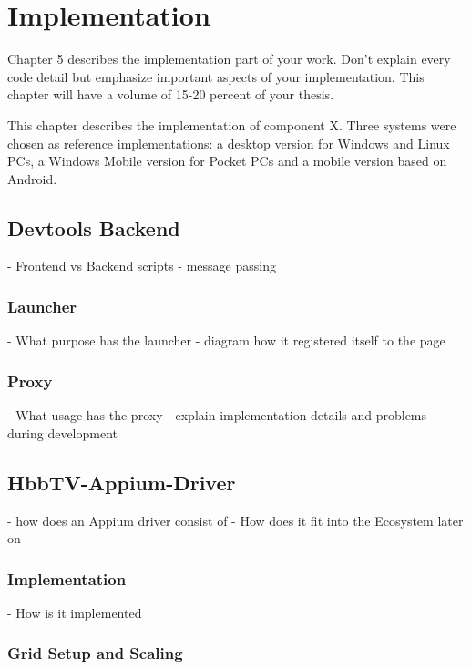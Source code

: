 \chapter{Implementation\label{cha:chapter5}}

Chapter 5 describes the implementation part of your work. Don't explain every code detail but emphasize
important aspects of your implementation. This chapter will have a volume of 15-20 percent of your thesis.

This chapter describes the implementation of component X. Three systems were chosen as
reference implementations: a desktop version for Windows and Linux PCs, a Windows Mobile
version for Pocket PCs and a mobile version based on Android.

\section{Devtools Backend\label{sec:implDevtoolsBackend}}

- Frontend vs Backend scripts
- message passing

\subsection{Launcher\label{sec:launcher}}

- What purpose has the launcher
- diagram how it registered itself to the page

\subsection{Proxy\label{sec:proxy}}

- What usage has the proxy
- explain implementation details and problems during development

\section{HbbTV-Appium-Driver\label{sec:driver}}

- how does an Appium driver consist of
- How does it fit into the Ecosystem later on

\subsection{Implementation\label{sec:implDriver}}

- How is it implemented

\subsection{Grid Setup and Scaling\label{sec:setupscaling}}

